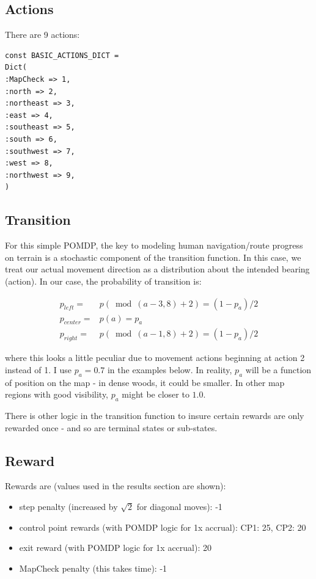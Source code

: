 \documentclass[twoside,11pt]{article}
\begin{document}
\subsection*{Actions}
There are 9 actions:

\begin{verbatim}
const BASIC_ACTIONS_DICT =
Dict(
:MapCheck => 1,
:north => 2,
:northeast => 3, 
:east => 4,
:southeast => 5,
:south => 6,
:southwest => 7,
:west => 8,
:northwest => 9,
)
\end{verbatim}

\subsection*{Transition}

For this simple POMDP, the key to modeling human navigation/route progress on terrain is a stochastic component of the transition function. In this case, we treat our actual movement direction as a distribution about the intended bearing (action). In our case, the probability of transition is:

\begin{align*}
p_{left} = & p(\bmod(a-3,8)+2) = (1-p_a)/2 \\
p_{center} = & p(a) = p_a \\
p_{right} = & p(\bmod(a-1,8)+2) = (1-p_a)/2
\end{align*}

where this looks a little peculiar due to movement actions beginning at action 2 instead of 1. I use $p_a = 0.7$ in the examples below. In reality, $p_a$ will be a function of position on the map - in dense woods, it could be smaller. In other map regions with good visibility, $p_a$ might be closer to $1.0$.

There is other logic in the transition function to insure certain rewards are only rewarded once - and so are terminal states or sub-states.

\subsection*{Reward}

Rewards are (values used in the results section are shown):

\begin{itemize}
\item step penalty (increased by $\sqrt{2}$ for diagonal moves): -1
\item control point rewards (with POMDP logic for 1x accrual): CP1: 25, CP2: 20
\item exit reward (with POMDP logic for 1x accrual): 20
\item MapCheck penalty (this takes time): -1
\end{itemize}
\end{document}
